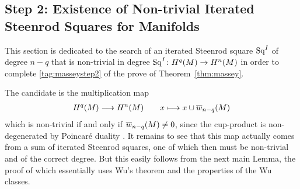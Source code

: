 \subsection[Non-trivial Iterated Steenrod Squares for Manifolds]
{Step 2: Existence of Non-trivial Iterated Steenrod Squares for Manifolds}

This section is dedicated to the search of an iterated Steenrod square
$\mathrm{Sq}^{I}$ of degree $n-q$ that is non-trivial in degree
$\mathrm{Sq}^{I}\colon H^q(M)\to H^n(M)$ in order to complete
\ref{tag:masseystep2} of the prove of Theorem~\ref{thm:massey}.

The candidate is the multiplication map
\begin{gather*}
  H^q(M) \longrightarrow H^n(M)
  \qquad
  x\longmapsto x\cup{\overline{w}_{n-q}}(M)
\end{gather*}
which is non-trivial if and only if ${\overline{w}_{n-q}}(M)\neq 0$, since the
cup-product is non-degenerated by Poincaré duality
\cite[Proposition~3.38]{hatcher}.
It remains to see that this map actually comes from a sum of
iterated Steenrod squares, one of which then must be non-trivial and
of the correct degree.
But this easily follows from the next main Lemma,
the proof of which essentially uses Wu's theorem and the properties of
the Wu classes.

